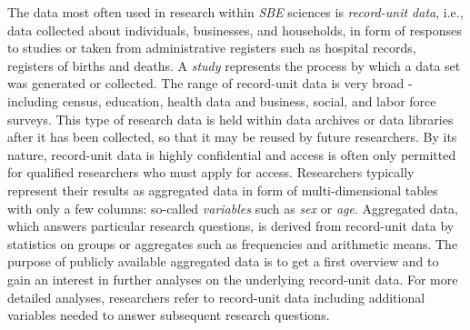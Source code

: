 \documentclass[conference]{IEEEtran}
\begin{document}
The data most often used in research within \emph{SBE} sciences is \emph{record-unit data}, i.e., data collected about individuals, businesses, and households, in form of responses to studies or taken from administrative registers such as hospital records, registers of births and deaths. A \emph{study} represents the process by which a data set was generated or collected. The range of record-unit data is very broad - including census, education, health data and business, social, and labor force surveys. This type of research data is held within data archives or data libraries after it has been collected, so that it may be reused by future researchers. By its nature, record-unit data is highly confidential and access is often only permitted for qualified researchers who must apply for access. Researchers typically represent their results as aggregated data in form of multi-dimensional tables with only a few columns: so-called \emph{variables} such as \emph{sex} or \emph{age}. Aggregated data, which answers particular research questions, is derived from record-unit data by statistics on groups or aggregates such as frequencies and arithmetic means. The purpose of publicly available aggregated data is to get a first overview and to gain an interest in further analyses on the underlying record-unit data. For more detailed analyses, researchers refer to record-unit data including additional variables needed to answer subsequent research questions. 
\end{document}
